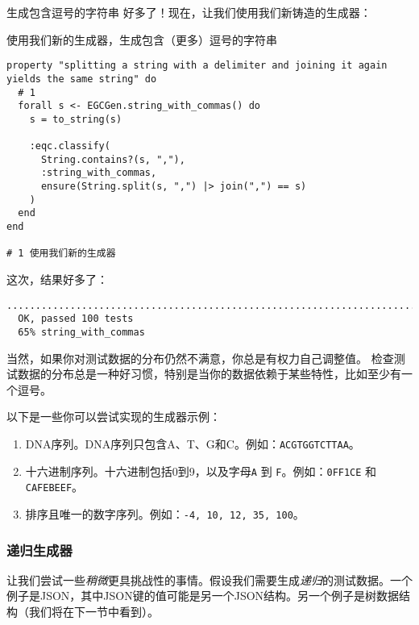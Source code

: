 \begin{example}{生成包含逗号的字符串}
好多了！现在，让我们使用我们新铸造的生成器：


\begin{code}{使用我们新的生成器，生成包含（更多）逗号的字符串}
\begin{verbatim}
property "splitting a string with a delimiter and joining it again yields the same string" do
  # 1
  forall s <- EGCGen.string_with_commas() do
    s = to_string(s)

    :eqc.classify(
      String.contains?(s, ","),
      :string_with_commas,
      ensure(String.split(s, ",") |> join(",") == s)
    )
  end
end

# 1 使用我们新的生成器
\end{verbatim}
\label{lst:using_our_new_generator_to_generate_strings_with_more_commas}
\end{code}


这次，结果好多了：
\begin{code}{}  \begin{verbatim}
....................................................................................................
  OK, passed 100 tests
  65% string_with_commas
\end{verbatim}
  \end{code}
  

当然，如果你对测试数据的分布仍然不满意，你总是有权力自己调整值。
检查测试数据的分布总是一种好习惯，特别是当你的数据依赖于某些特性，比如至少有一个逗号。
\end{example}

以下是一些你可以尝试实现的生成器示例：
\begin{enumerate}
\item  DNA序列。DNA序列只包含A、T、G和C。例如：\texttt{ACGTGGTCTTAA}。
\item  十六进制序列。十六进制包括0到9，以及字母\texttt{A} 到 \texttt{F}。例如：\texttt{0FF1CE} 和 \texttt{CAFEBEEF}。
\item  排序且唯一的数字序列。例如：\texttt{-4, 10, 12, 35, 100}。
\end{enumerate}

\subsubsection{递归生成器}

让我们尝试一些\emph{稍微}更具挑战性的事情。假设我们需要生成\emph{递归}的测试数据。一个例子是JSON，其中JSON键的值可能是另一个JSON结构。另一个例子是树数据结构（我们将在下一节中看到）。

